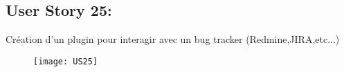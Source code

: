 \newpage
\subsection{User Story 25:}
Création d'un plugin pour interagir avec un bug tracker (Redmine,JIRA,etc...)


\begin{figure}[!h]
  \begin{center}
        \texttt{[image: US25]}
        \label{US25-dia}
  \end{center}
\end{figure}
